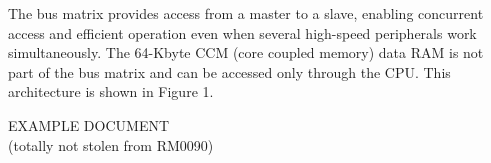 \noindent The bus matrix provides access from a master to a slave, enabling concurrent access and 
efficient operation even when several high-speed peripherals work simultaneously. 
The 64-Kbyte CCM (core coupled memory) data RAM is not part of the bus matrix and can be 
accessed only through the CPU. This architecture is shown in Figure 1.

\vfill{}
\begin{center}
EXAMPLE DOCUMENT \\ \small (totally not stolen from RM0090)
\end{center}
\vfill{}